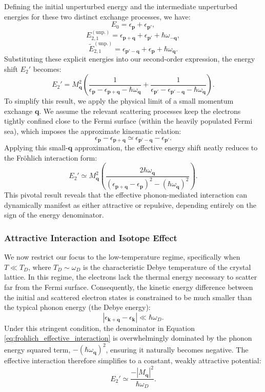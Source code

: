 Defining the initial unperturbed energy and the intermediate unperturbed energies for these two distinct exchange processes, we have:
\[
    E_0 = \epsilon_{\mathbf{p}} + \epsilon_{\mathbf{p}'},
\]
\[
    E_{2,1}^{(\text{unp.})} = \epsilon_{\mathbf{p}+\mathbf{q}} + \epsilon_{\mathbf{p}'} + \hbar\omega_{-\mathbf{q}},
\]
\[
    \tilde{E}_{2,1}^{(\text{unp.})} = \epsilon_{\mathbf{p}'-\mathbf{q}} + \epsilon_{\mathbf{p}} + \hbar\omega_{\mathbf{q}}.
\]
Substituting these explicit energies into our second-order expression, the energy shift \( E_2' \) becomes:
\[
    E_2' = M_{\mathbf{q}}^2 \left( \frac{1}{\epsilon_{\mathbf{p}} - \epsilon_{\mathbf{p}+\mathbf{q}} - \hbar\omega_{\mathbf{q}}} + \frac{1}{\epsilon_{\mathbf{p}'} - \epsilon_{\mathbf{p}'-\mathbf{q}} - \hbar\omega_{\mathbf{q}}} \right).
\]
To simplify this result, we apply the physical limit of a small momentum exchange \( \mathbf{q} \). We assume the relevant scattering processes keep the electrons tightly confined close to the Fermi surface (within the heavily populated Fermi sea), which imposes the approximate kinematic relation:
\[
    \epsilon_{\mathbf{p}} - \epsilon_{\mathbf{p}+\mathbf{q}} \simeq \epsilon_{\mathbf{p}'-\mathbf{q}} - \epsilon_{\mathbf{p}'}.
\]
Applying this small-\( \mathbf{q} \) approximation, the effective energy shift neatly reduces to the Fröhlich interaction form:
\begin{equation} \label{eq:frohlich_effective_interaction}
    E_2' \simeq M_{\mathbf{q}}^2 \left( \frac{2\hbar\omega_{\mathbf{q}}}{(\epsilon_{\mathbf{p}+\mathbf{q}} - \epsilon_{\mathbf{p}})^2 - (\hbar\omega_{\mathbf{q}})^2} \right).
\end{equation}
This pivotal result reveals that the effective phonon-mediated interaction can dynamically manifest as either attractive or repulsive, depending entirely on the sign of the energy denominator.

\subsubsection{Attractive Interaction and Isotope Effect}

We now restrict our focus to the low-temperature regime, specifically when \( T \ll T_D \), where \( T_D \sim \omega_D \) is the characteristic Debye temperature of the crystal lattice. In this regime, the electrons lack the thermal energy necessary to scatter far from the Fermi surface. Consequently, the kinetic energy difference between the initial and scattered electron states is constrained to be much smaller than the typical phonon energy (the Debye energy):
\[
    |\epsilon_{\mathbf{k}+\mathbf{q}} - \epsilon_{\mathbf{k}}| \ll \hbar\omega_D.
\]
Under this stringent condition, the denominator in Equation \ref{eq:frohlich_effective_interaction} is overwhelmingly dominated by the phonon energy squared term, \( -(\hbar\omega_{\mathbf{q}})^2 \), ensuring it naturally becomes negative. The effective interaction therefore simplifies to a constant, weakly attractive potential:
\begin{equation} \label{eq:attractive_potential_approx}
    E_2' \simeq \frac{-|M_{\mathbf{q}}|^2}{\hbar\omega_D}.
\end{equation}

